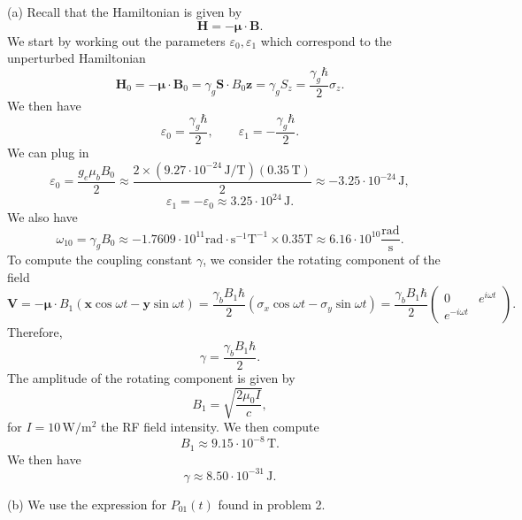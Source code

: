 \documentclass[11pt, letterpaper]{article}
\begin{document}
(a) Recall that the Hamiltonian is given by
\[
	\mathbf{H}=-\boldsymbol{\mu} \cdot \mathbf{B} 
.\]
We start by working out the parameters $\varepsilon _0,\varepsilon _1$ which correspond to the unperturbed Hamiltonian
\[
	\mathbf{H} _0=-\boldsymbol{\mu }\cdot \mathbf{B} _0=\gamma _g\mathbf{S} \cdot B_0 \mathbf{z} =\gamma _gS_z=\frac{\gamma _g\hbar}{2} \sigma _z
.\]
We then have
\[
	\varepsilon _0=\frac{\gamma _g\hbar}{2} ,\qquad \varepsilon _1=-\frac{\gamma _g\hbar}{2} 
.\]
We can plug in
\[
	\varepsilon_0=\frac{g_e\mu _bB_0}{2} \approx \frac{2\times \left( 9.27\cdot 10^{-24} \,\mathrm{J} /\mathrm{T}  \right) \left( 0.35\,\mathrm{T}  \right) }{2} \approx -3.25\cdot 10^{-24} \,\mathrm{J} ,
\]
\[
	\varepsilon _1=-\varepsilon _0\approx 3.25\cdot 10^{24} \,\mathrm{J} 
.\]
We also have
\[
	\omega_{10} =\gamma_gB_0 \approx -1.7609 \cdot 10^{11} \mathrm{rad}\cdot \mathrm{s} ^{-1} \mathrm{T} ^{-1} \times  0.35\mathrm{T} \approx 6.16\cdot 10^{10} \frac{\mathrm{rad} }{\mathrm{s} } 
.\]
To compute the coupling constant $\gamma $, we consider the rotating component of the field
\[
	\mathbf{V} = -\boldsymbol{\mu} \cdot B_1(\mathbf{x} \cos \omega t-\mathbf{y} \sin \omega t)=\frac{\gamma _bB_1\hbar}{2} (\sigma _x \cos \omega t-\sigma _y \sin \omega t)=\frac{\gamma _bB_1\hbar}{2} \begin{pmatrix}
	0 & e^{i\omega t}  \\
	e^{-i\omega t}  & 
	\end{pmatrix}
.\]
Therefore,
\[
	\gamma =\frac{\gamma _b B_1\hbar}{2} 
.\]
The amplitude of the rotating component is given by
\[
	B_1=\sqrt{\frac{2\mu _0I}{c} } ,
\]
for $I=10\,\mathrm{W} /\mathrm{m} ^2$ the RF field intensity. We then compute
\[
	B_1 \approx 9.15\cdot 10^{-8} \,\mathrm{T} 
.\]
We then have
\[
	\gamma \approx 8.50\cdot 10^{-31} \,\mathrm{J} 
.\]

(b) We use the expression for $P_{01} (t)$ found in problem 2.
\end{document}
